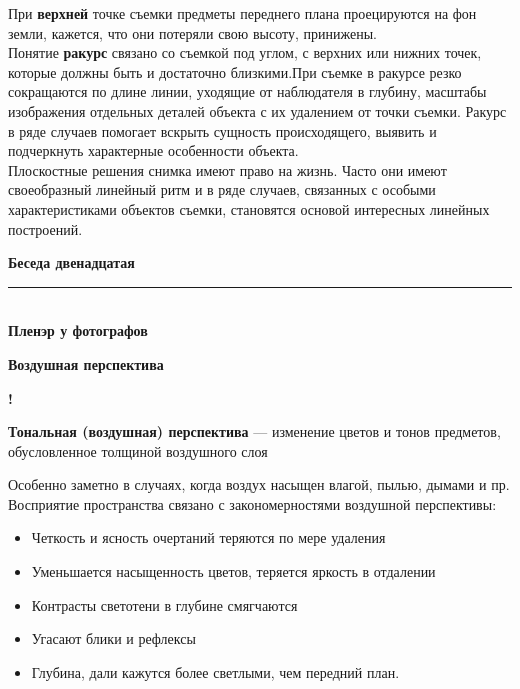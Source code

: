 \documentclass{article}
\newcommand{\important}[1]{\textbf{#1}}
\renewcommand{\section}[2]{
	\vspace{6em}
	\begin{flushright}
		\Large
		\baselineskip=0.5\baselineskip
		\textbf{#1}
		\\
		\rule[0.5\baselineskip]{\textwidth}{0.15pt}
		\\
		\textbf{#2}
	\end{flushright}
}
\renewcommand{\subsection}[1]{
	\vspace{2em}
	\begin{flushright}
		\large
		\textbf{#1}
	\end{flushright}
}
\newcommand{\define}[2]{
	\textbf{#1} --- #2
}
\newcommand{\definewithmark}[2]{
	\begin{flushright}\textbf{!}\hspace{2ex}\vline\hspace{2ex}
		\begin{minipage}{0.9\textwidth}
			\define{#1}{#2}
		\end{minipage}
	\end{flushright}
}
\begin{document}
При \important{верхней} точке съемки предметы переднего плана проецируются на фон земли, кажется, что они потеряли свою высоту, принижены.\\
Понятие \important{ракурс} связано со съемкой под углом, с верхних или нижних точек, которые должны быть и достаточно близкими.При съемке в ракурсе резко сокращаются по длине линии, уходящие от наблюдателя в глубину, масштабы изображения отдельных деталей объекта с их удалением от точки съемки. Ракурс в ряде случаев помогает вскрыть сущность происходящего, выявить и подчеркнуть характерные особенности объекта.\\
Плоскостные решения снимка имеют право на жизнь. Часто они имеют своеобразный линейный ритм и в ряде случаев, связанных с особыми характеристиками объектов съемки, становятся основой интересных линейных построений.
\section{Беседа двенадцатая}{Пленэр у фотографов}
\subsection{Воздушная перспектива}
\definewithmark{Тональная (воздушная) перспектива}{изменение цветов и тонов предметов, обусловленное толщиной воздушного слоя}
Особенно заметно в случаях, когда воздух насыщен влагой, пылью, дымами и пр.\\ Восприятие пространства связано с закономерностями воздушной перспективы:
\begin{itemize}
	\item Четкость и ясность очертаний теряются по мере удаления
	\item Уменьшается насыщенность  цветов, теряется яркость в отдалении
	\item Контрасты светотени в глубине смягчаются
	\item Угасают блики и рефлексы
	\item Глубина, дали кажутся более светлыми, чем передний план.
\end{itemize}
\end{document}
